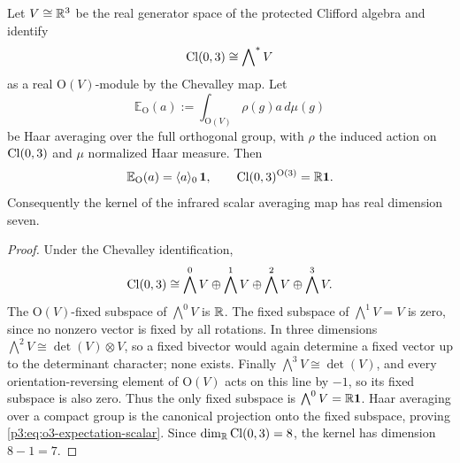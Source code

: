 \documentclass[12pt,a4paper]{article}
\begin{document}
\begin{lemma}
\label{p3:lem:o3-clifford-expectation}
Let $V\cong\mathbb{R}^3$ be the real generator space of the protected Clifford algebra and identify
\[
\operatorname{Cl}(0,3)\cong \bigwedge\nolimits^* V
\]
as a real $\mathrm O(V)$-module by the Chevalley map.  Let
\[
\mathbb E_{\mathrm O}(a):=\int_{\mathrm O(V)} \rho(g)a\,d\mu(g)
\]
be Haar averaging over the full orthogonal group, with $\rho$ the induced action on
$\operatorname{Cl}(0,3)$ and $\mu$ normalized Haar measure.  Then
\begin{equation}
\label{p3:eq:o3-expectation-scalar}
\mathbb E_{\mathrm O}(a)=\langle a\rangle_0\,\mathbf 1,
\qquad
\operatorname{Cl}(0,3)^{\mathrm O(3)}=\mathbb{R}\mathbf 1.
\end{equation}
Consequently the kernel of the infrared scalar averaging map has real dimension seven.
\end{lemma}

\begin{proof}
Under the Chevalley identification,
\[
\operatorname{Cl}(0,3)\cong \bigwedge^0 V\oplus\bigwedge^1 V\oplus\bigwedge^2 V\oplus\bigwedge^3 V .
\]
The $\mathrm O(V)$-fixed subspace of $\bigwedge^0 V$ is $\mathbb{R}$.  The fixed subspace of
$\bigwedge^1V=V$ is zero, since no nonzero vector is fixed by all rotations.  In three
dimensions $\bigwedge^2V\cong \det(V)\otimes V$, so a fixed bivector would again determine
a fixed vector up to the determinant character; none exists.  Finally
$\bigwedge^3V\cong\det(V)$, and every orientation-reversing element of $\mathrm O(V)$ acts
on this line by $-1$, so its fixed subspace is also zero.  Thus the only fixed subspace is
$\bigwedge^0V=\mathbb{R}\mathbf 1$.  Haar averaging over a compact group is the canonical projection
onto the fixed subspace, proving \eqref{p3:eq:o3-expectation-scalar}.  Since
$\dim_{\mathbb{R}}\operatorname{Cl}(0,3)=8$, the kernel has dimension $8-1=7$.
\end{proof}
\end{document}
